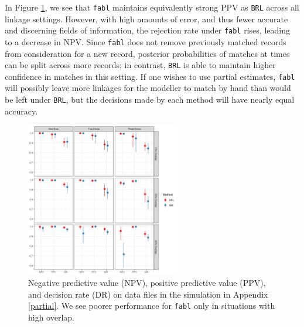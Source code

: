 \documentclass[ba]{imsart}
\begin{document}
In Figure \ref{fig:sadinle_simulation_partial}, we see that \texttt{fabl} maintains equivalently strong PPV as \texttt{BRL} across all linkage settings. However, with high amounts of error, and thus fewer accurate and discerning fields of information, the rejection rate under \texttt{fabl} rises, leading to a decrease in NPV. Since \texttt{fabl} does not remove previously matched records from consideration for a new record, posterior probabilities of matches at times can be split across more records; in contrast, \texttt{BRL} is able to maintain higher confidence in matches in this setting. If one wishes to use partial estimates, \texttt{fabl} will possibly leave more linkages for the modeller to match by hand than would be left under \texttt{BRL}, but the decisions made by each method will have nearly equal accuracy. 



\begin{figure}[t]
	\begin{center}
		\includegraphics[width=0.6\textwidth]{../notes/figures/sadinle_sim_plot_partial_DR} 
		\caption{Negative predictive value (NPV), positive predictive value (PPV), and decision rate (DR) on data files in the simulation in Appendix \ref{partial}. We see poorer performance for \texttt{fabl} only in situations with high overlap.}
		\label{fig:sadinle_simulation_partial}
	\end{center}
\end{figure}
	
\end{document}
